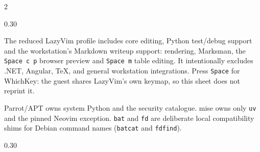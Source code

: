 \documentclass[10pt]{extarticle}
\begin{document}
\begin{multicols}{2}
\begin{cskeys}{0.30\linewidth}
\csrow{Prefix [}{scroll/copy mode}
\end{cskeys}

The reduced LazyVim profile includes core editing, Python test/debug support
and the workstation's Markdown writeup support: rendering, Marksman, the
\texttt{Space c p} browser preview and \texttt{Space m} table editing. It
intentionally excludes .NET, Angular, TeX, and general workstation
integrations. Press \texttt{Space} for WhichKey: the guest shares LazyVim's own
keymap, so this sheet does not reprint it.\par

Parrot/APT owns system Python and the security catalogue. mise owns only
\texttt{uv} and the pinned Neovim exception. \texttt{bat} and \texttt{fd} are
deliberate local compatibility shims for Debian command names
(\texttt{batcat} and \texttt{fdfind}).\par

\begin{cskeys}{0.30\linewidth}
\end{cskeys}

\end{multicols}
\end{document}
